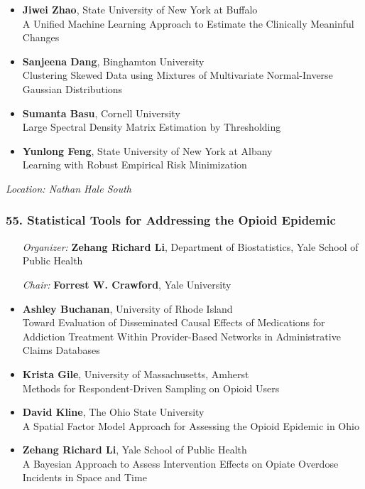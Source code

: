 \begin{itemize}
\item \textbf{Jiwei Zhao}, State University of New York at Buffalo \\
A Unified Machine Learning Approach to Estimate the Clinically Meaninful Changes
\item \textbf{Sanjeena Dang}, Binghamton University \\
Clustering Skewed Data using Mixtures of Multivariate Normal-Inverse Gaussian Distributions
\item \textbf{Sumanta Basu}, Cornell University \\
Large Spectral Density Matrix Estimation by Thresholding
\item \textbf{Yunlong Feng}, State University of New York at Albany \\
Learning with Robust Empirical Risk Minimization
\end{itemize}

\emph{Location: Nathan Hale South}

\subsubsection*{55. Statistical Tools for Addressing the Opioid Epidemic}

\begin{enumerate}[align=left]
\item [\emph{Organizer:}] \textbf{Zehang Richard Li}, Department of Biostatistics, Yale School of Public Health
\item [\emph{Chair:}] \textbf{Forrest W. Crawford},  Yale University
\end{enumerate}

\begin{itemize}
\item \textbf{Ashley Buchanan}, University of Rhode Island \\
Toward Evaluation of Disseminated Causal Effects of Medications for Addiction Treatment Within Provider-Based Networks in Administrative Claims Databases
\item \textbf{Krista Gile}, University of Massachusetts, Amherst \\
Methods for Respondent-Driven Sampling on Opioid Users
\item \textbf{David Kline}, The Ohio State University \\
A Spatial Factor Model Approach for Assessing the Opioid Epidemic in Ohio
\item \textbf{Zehang Richard Li}, Yale School of Public Health \\
A Bayesian Approach to Assess Intervention Effects on Opiate Overdose Incidents in Space and Time
\end{itemize}

